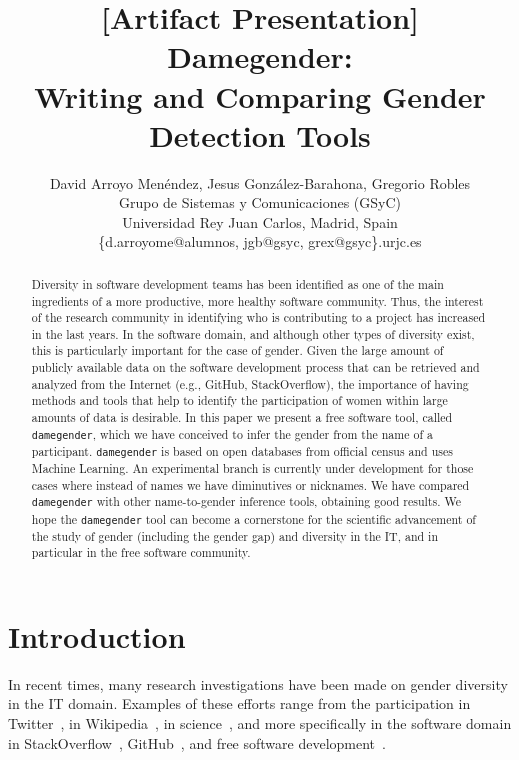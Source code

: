 \documentclass[a4paper]{article}
\title{[Artifact Presentation] Damegender: \\ Writing and Comparing Gender Detection Tools}
\author{
David Arroyo Menéndez, Jesus González-Barahona, Gregorio Robles \\ Grupo de Sistemas y Comunicaciones (GSyC) \\ Universidad Rey Juan Carlos, Madrid, Spain \\ \{d.arroyome@alumnos, jgb@gsyc, grex@gsyc\}.urjc.es
}
\begin{document}
\maketitle

\begin{abstract}
Diversity in software development teams has been identified as one of the main ingredients of a more productive, more healthy software community.
Thus, the interest of the research community in identifying who is contributing to a project has increased in the last years.
In the software domain, and although other types of diversity exist, this is particularly important for the case of gender.
Given the large amount of publicly available data on the software development process that can be retrieved and analyzed from the Internet (e.g., GitHub, StackOverflow), the importance of having methods and tools that help to identify the participation of women within large amounts of data is desirable.
In this paper we present a free software tool, called \texttt{damegender}, which we have conceived to infer the gender from the name of a participant.
\texttt{damegender} is based on open databases from official census and uses Machine Learning.
An experimental branch is currently under development for those cases where instead of names we have diminutives or nicknames.
We have compared \texttt{damegender} with other name-to-gender inference tools, obtaining good results.
We hope the \texttt{damegender} tool can become a cornerstone for the scientific advancement of the study of gender (including the gender gap) and diversity in the IT, and in particular in the free software community.
\end{abstract}


\section{Introduction}

In recent times, many research investigations have been made on gender diversity in the IT domain.
Examples of these efforts range from the participation in Twitter~\cite{burger2011discriminating,mislove2011understanding},
in Wikipedia~\cite{antin2011gender,hill2013wikipedia}, in science~\cite{holman2018gender,dollar1999gender}, and more specifically in the software domain in StackOverflow~\cite{vasilescu2012gender,vasilescu2015gender}, GitHub~\cite{vasilescu2015gender}, and free software development~\cite{robles2014floss,izquierdo2018openstack,lee2019floss,catolino2019gender}.
\end{document}
